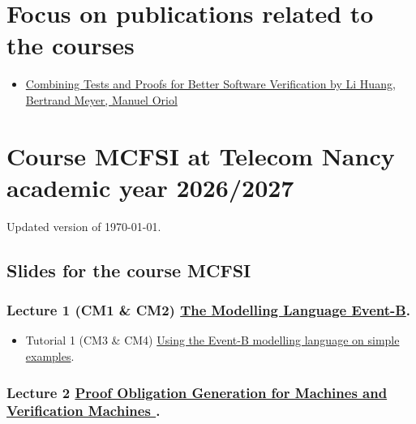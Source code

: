 \documentclass[ 12pt]{article}
\begin{document}
\section{Focus on publications related to the courses}
\label{sec:focus-publ-relat}


\begin{itemize}
\item  \href{https://arxiv.org/abs/2601.16239}{Combining Tests and Proofs for Better Software Verification by
    Li Huang, Bertrand Meyer, Manuel Oriol}
  
\end{itemize}







\section{Course MCFSI  at Telecom Nancy academic year 2026/2027}
\label{sec:course-mcfsi-at}

Updated version of \today.



\subsection{Slides for the course MCFSI}
\label{sec:slides}



\subsubsection{Lecture 1  (CM1 \& CM2) 
  \href{http://mery54.github.io/teaching/mosos/lecturesnotes/mcfsi-lect1.pdf}{The 
    Modelling Language Event-B}. 
}

\begin{itemize}
\item   Tutorial 1  (CM3 \& CM4)      \href{http://mery54.github.io/teaching/mosos/lecturesnotes/mcfsi-td1.pdf}{Using
      the Event-B modelling language on simple examples}.


\end{itemize}

\subsubsection{Lecture 2
    \href{http://mery54.github.io/teaching/mosos/lecturesnotes/mcfsi-po1.pdf}{Proof
      Obligation Generation  for Machines  and   Verification Machines }.}
\end{document}
